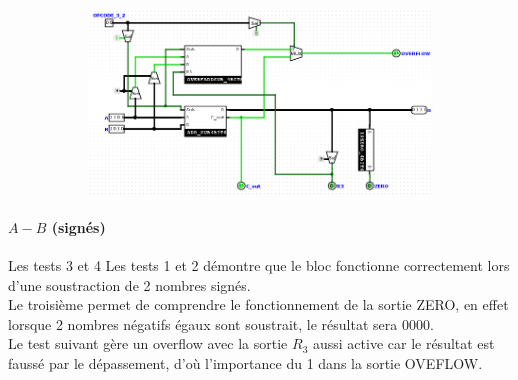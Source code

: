 \documentclass[a4paper]{article}
\begin{document}
\begin{tcolorbox}[colframe=Monokaimagenta,colback=white]
\begin{figure}[H]
   \begin{subfigure}{.7\textwidth}
        \centering
        \includegraphics[width=.8\linewidth]{src/ADDSUB_TEST_AplB1.png}
        \label{fig:ex_moins_signes1}
   \end{subfigure}


\end{figure}

\paragraph{$A-B$ (signés)}
Les tests 3 et 4 Les tests 1 et 2 démontre que le bloc fonctionne correctement lors d'une soustraction de 2 nombres signés.\\
Le troisième permet de comprendre le fonctionnement de la sortie ZERO, en effet lorsque 2 nombres négatifs égaux sont soustrait, le résultat sera 0000.\\
Le test suivant gère un overflow avec la sortie $R_3$ aussi active car le résultat est faussé par le dépassement, d'où l'importance du 1 dans la sortie OVEFLOW.


\end{tcolorbox}
\end{document}
